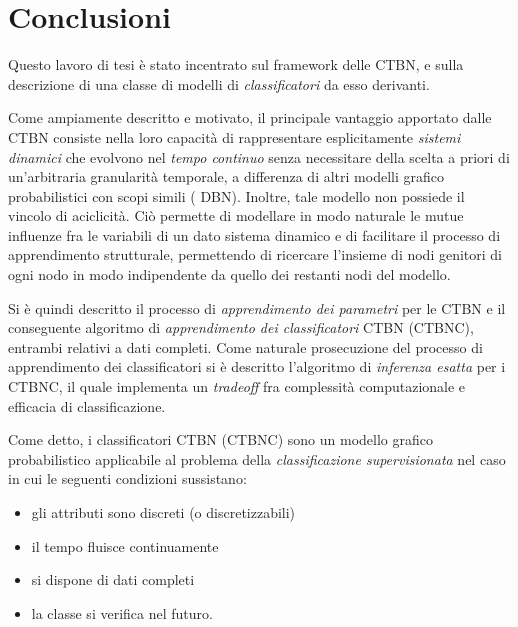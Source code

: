 
\cleardoublepage
{}
{}
\chapter*{Conclusioni}\label{cap:concl}
Questo lavoro di tesi è stato incentrato sul framework delle \acf{CTBN}, e sulla descrizione di una classe di modelli di \emph{classificatori} da esso derivanti.

Come ampiamente descritto e motivato, il principale vantaggio apportato dalle \acs{CTBN} consiste nella loro capacità di rappresentare esplicitamente \emph{sistemi dinamici} che evolvono nel \emph{tempo continuo} senza necessitare della scelta a priori di un'arbitraria granularità temporale, a differenza di altri modelli grafico probabilistici con scopi simili (\eg{} \acl{DBN}). Inoltre, tale modello non possiede il vincolo di aciclicità. Ciò permette di modellare in modo naturale le mutue influenze fra le variabili di un dato sistema dinamico e di facilitare il processo di apprendimento strutturale, permettendo di ricercare l'insieme di nodi genitori di ogni nodo in modo indipendente da quello dei restanti nodi del modello.

Si è quindi descritto il processo di \emph{apprendimento dei parametri} per le \acs{CTBN} e il conseguente algoritmo di \emph{apprendimento dei classificatori} \acs{CTBN} (\acs{CTBNC}), entrambi relativi a dati completi. Come naturale prosecuzione del processo di apprendimento dei classificatori si è descritto l'algoritmo di \emph{inferenza esatta} per i \acs{CTBNC}, il quale implementa un \emph{tradeoff} fra complessità computazionale e efficacia di classificazione.

Come detto, i classificatori \acs{CTBN} (\acs{CTBNC}) sono un modello grafico probabilistico applicabile al problema della \emph{classificazione supervisionata} nel caso in cui le seguenti condizioni sussistano:
\begin{itemize}
	\item gli attributi sono discreti (o discretizzabili)
	\item il tempo fluisce continuamente
	\item si dispone di dati completi
	\item la classe si verifica nel futuro.
\end{itemize}

